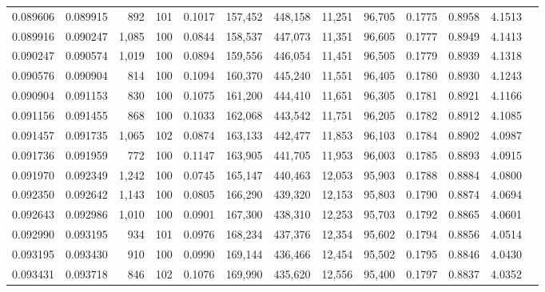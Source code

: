 \begin{tabular}{rrrrrrrrrrrrr}
0.089606 & 0.089915 &   892 & 101 &                                     0.1017 & 157,452 & 448,158 &  11,251 &  96,705 & 0.1775 & 0.8958 & 4.1513 \\
0.089916 & 0.090247 & 1,085 & 100 &                                     0.0844 & 158,537 & 447,073 &  11,351 &  96,605 & 0.1777 & 0.8949 & 4.1413 \\
0.090247 & 0.090574 & 1,019 & 100 &                                     0.0894 & 159,556 & 446,054 &  11,451 &  96,505 & 0.1779 & 0.8939 & 4.1318 \\
0.090576 & 0.090904 &   814 & 100 &                                     0.1094 & 160,370 & 445,240 &  11,551 &  96,405 & 0.1780 & 0.8930 & 4.1243 \\
0.090904 & 0.091153 &   830 & 100 &                                     0.1075 & 161,200 & 444,410 &  11,651 &  96,305 & 0.1781 & 0.8921 & 4.1166 \\
0.091156 & 0.091455 &   868 & 100 &                                     0.1033 & 162,068 & 443,542 &  11,751 &  96,205 & 0.1782 & 0.8912 & 4.1085 \\
0.091457 & 0.091735 & 1,065 & 102 &                                     0.0874 & 163,133 & 442,477 &  11,853 &  96,103 & 0.1784 & 0.8902 & 4.0987 \\
0.091736 & 0.091959 &   772 & 100 &                                     0.1147 & 163,905 & 441,705 &  11,953 &  96,003 & 0.1785 & 0.8893 & 4.0915 \\
0.091970 & 0.092349 & 1,242 & 100 &                                     0.0745 & 165,147 & 440,463 &  12,053 &  95,903 & 0.1788 & 0.8884 & 4.0800 \\
0.092350 & 0.092642 & 1,143 & 100 &                                     0.0805 & 166,290 & 439,320 &  12,153 &  95,803 & 0.1790 & 0.8874 & 4.0694 \\
0.092643 & 0.092986 & 1,010 & 100 &                                     0.0901 & 167,300 & 438,310 &  12,253 &  95,703 & 0.1792 & 0.8865 & 4.0601 \\
0.092990 & 0.093195 &   934 & 101 &                                     0.0976 & 168,234 & 437,376 &  12,354 &  95,602 & 0.1794 & 0.8856 & 4.0514 \\
0.093195 & 0.093430 &   910 & 100 &                                     0.0990 & 169,144 & 436,466 &  12,454 &  95,502 & 0.1795 & 0.8846 & 4.0430 \\
0.093431 & 0.093718 &   846 & 102 &                                     0.1076 & 169,990 & 435,620 &  12,556 &  95,400 & 0.1797 & 0.8837 & 4.0352 \\

\end{tabular}
